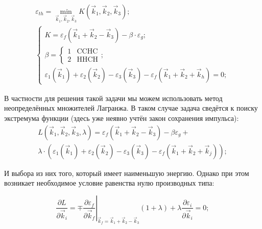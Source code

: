 \documentclass[../main.tex]{subfiles}
\begin{document}
    \begin{equation}
        \begin{array}{l}
            \label{gfunc}
            \varepsilon_{th} = \min_{\vec{k}_1, \vec{k}_2, \vec{k}_3} K (\vec{k}_1, \vec{k}_2, \vec{k}_3);\\
            \begin{cases}
                K  = \varepsilon_f(\vec{k}_1 + \vec{k}_2 - \vec{k}_3) - \beta \cdot \varepsilon_g;\\
                \beta = \begin{cases}
                            1   & \text{CCHC}\\
                            2   & \text{HHCH}
                        \end{cases};\\
                \varepsilon_1(\vec{k}_1) + \varepsilon_2(\vec{k}_2) - \varepsilon_3(\vec{k}_3) - \varepsilon_f(\vec{k}_1 + \vec{k}_2 + \vec{k}_h) = 0;
            \end{cases}
        \end{array}
    \end{equation}



    
    В частности для решения такой задачи мы можем использовать метод 
    неопределённых множителей Лагранжа. В таком случае задача сведётся
    к поиску экстремума функции (здесь уже неявно учтён 
    закон сохранения импульса):
    \begin{multline}
        L (\vec{k}_1,\vec{k}_2,\vec{k}_3, \lambda) = \varepsilon_f(\vec{k}_1 + \vec{k}_2 - \vec{k}_3) - \beta \varepsilon_g + \\
            \lambda \cdot \left(\varepsilon_1(\vec{k}_1) + 
            \varepsilon_2(\vec{k}_2) - \varepsilon_3(\vec{k}_3) - \varepsilon_f(\vec{k}_1 + \vec{k}_2 + \vec{k}_j)\right);
    \end{multline}

    И выбора из них того, который имеет наименьшую энергию. Однако при этом возникает
    необходимое условие равенства нулю производных типа:

    \begin{equation*}
        \frac{\partial L}{\partial \vec{k}_i} = 
            \mp \left. \frac{\partial \varepsilon_f}{\partial \vec{k}_f}\right\rvert_{\vec{k}_f = \vec{k}_1 + \vec{k}_2 - \vec{k}_3} 
            (1 + \lambda)  + \lambda \frac{\partial \varepsilon_i}{\partial \vec{k}_i} = 0;
    \end{equation*}
\end{document}
